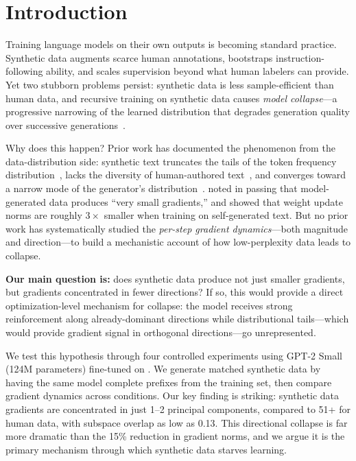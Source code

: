 \section{Introduction}
\label{sec:intro}

Training language models on their own outputs is becoming standard practice. Synthetic data augments scarce human annotations, bootstraps instruction-following ability, and scales supervision beyond what human labelers can provide. Yet two stubborn problems persist: synthetic data is less sample-efficient than human data, and recursive training on synthetic data causes \emph{model collapse}---a progressive narrowing of the learned distribution that degrades generation quality over successive generations~\citep{shumailov2023curse}.

Why does this happen? Prior work has documented the phenomenon from the data-distribution side: synthetic text truncates the tails of the token frequency distribution~\citep{dohmatob2024tale}, lacks the diversity of human-authored text~\citep{kazdan2024bad}, and converges toward a narrow mode of the generator's distribution~\citep{wang2024theoretical}. \citet{shumailov2023curse} noted in passing that model-generated data produces ``very small gradients,'' and \citet{wu2025mitigating} showed that weight update norms are roughly $3\times$ smaller when training on self-generated text. But no prior work has systematically studied the \emph{per-step gradient dynamics}---both magnitude and direction---to build a mechanistic account of how low-perplexity data leads to collapse.

{\bf Our main question is:} does synthetic data produce not just smaller gradients, but gradients concentrated in fewer directions? If so, this would provide a direct optimization-level mechanism for collapse: the model receives strong reinforcement along already-dominant directions while distributional tails---which would provide gradient signal in orthogonal directions---go unrepresented.

We test this hypothesis through four controlled experiments using GPT-2 Small (124M parameters) fine-tuned on \wikitext. We generate matched synthetic data by having the same model complete prefixes from the training set, then compare gradient dynamics across conditions. Our key finding is striking: synthetic data gradients are concentrated in just 1--2 principal components, compared to 51+ for human data, with subspace overlap as low as 0.13. This directional collapse is far more dramatic than the 15\% reduction in gradient norms, and we argue it is the primary mechanism through which synthetic data starves learning.

